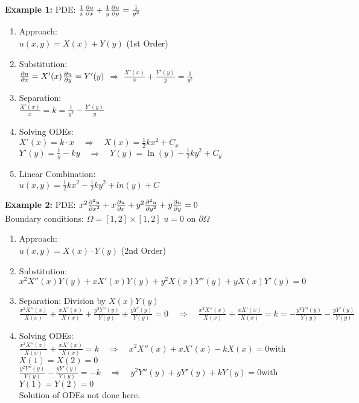 \begin{minipage}{0.49\textwidth}
\textbf{Example 1: } PDE: $\frac1x\frac{\partial u}{\partial x}+\frac1y\frac{\partial u}{\partial y}=\frac{1}{y^2}$
\begin{enumerate}
	\item Approach:\\[0.4cm]
	$u(x,y)=X(x) + Y(y)$ (1st Order)
	\item Substitution:\\[0.4cm]
	$\frac{\partial u}{\partial x}=X'(x)$\qquad $\frac{\partial u}{\partial y}=Y'(y)$ \quad $\Rightarrow$ \quad $\frac{X'(x)}{x}+\frac{Y'(y)}{y}=\frac{1}{y^2}$
	\item Separation:\\[0.4cm]
	$\frac{X'(x)}{x}=k=\frac{1}{y^2}-\frac{Y'(y)}{y}$
	\item Solving ODEs:\\[0.4cm]
	$X'(x)=k\cdot x \quad\Rightarrow\quad X(x)=\frac12 kx^2+C_x$\\
	$Y'(y)=\frac1y-ky \quad\Rightarrow\quad Y(y)=\ln(y)-\frac12 ky^2+C_y$
	\item Linear Combination:\\[0.4cm]
	$u(x,y)=\frac12 kx^2 - \frac12 ky^2+ln(y)+C$
\end{enumerate}

\textbf{Example 2: } PDE: $x^2\frac{\partial ^2u}{\partial x^2}+x\frac{\partial u}{\partial x}+y^2\frac{\partial ^2u}{\partial y^2}+y\frac{\partial u}{\partial y}=0$\\
Boundary conditions: $\Omega=[1,2]\times[1,2]$ \qquad $u=0$ on $\partial\Omega$
\begin{enumerate}
	\item Approach:\\[0.4cm]
	$u(x,y)=X(x) \cdot Y(y)$ (2nd Order)
	\item Substitution:\\[0.4cm]
	$x^2X''(x)Y(y)+xX'(x)Y(y)+y^2X(x)Y''(y)+yX(x)Y'(y)=0$
	\item Separation: Division by $X(x)Y(y)$\\[0.4cm]
	$\frac{x^2X''(x)}{X(x)}+\frac{xX'(x)}{X(x)}+\frac{y^2Y''(y)}{Y(y)}+\frac{yY'(y)}{Y(y)}=0\quad\Rightarrow\quad \frac{x^2X''(x)}{X(x)}+\frac{xX'(x)}{X(x)}=k=-\frac{y^2Y''(y)}{Y(y)}-\frac{yY'(y)}{Y(y)}$
	\item Solving ODEs:\\[0.4cm]
	$\frac{x^2X''(x)}{X(x)}+\frac{xX'(x)}{X(x)}=k\quad\Rightarrow\quad x^2X''(x)+xX'(x)-kX(x)=0$\qquad with $X(1)=X(2)=0$\\
	$\frac{y^2Y''(y)}{Y(y)}-\frac{yY'(y)}{Y(y)}=-k\quad\Rightarrow\quad y^2Y''(y)+yY'(y)+kY(y)=0$\qquad with $Y(1)=Y(2)=0$\\[0.4cm]
	Solution of ODEs not done here.
\end{enumerate}
\end{minipage}
